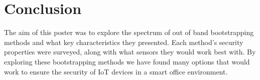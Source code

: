 \section{Conclusion}

The aim of this poster was to explore the spectrum of out of band bootstrapping methods and what key characteristics they presented.
Each method’s security properties were surveyed, along with what sensors they would work best with.
By exploring these bootstrapping methods we have found many options that would work to ensure the security of IoT devices in a smart office environment. 
